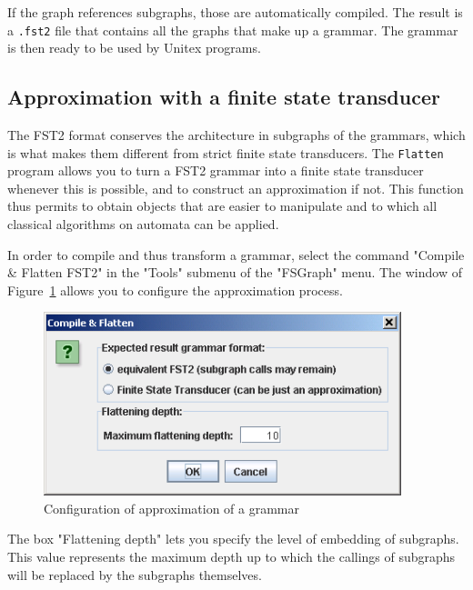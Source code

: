 \noindent If the graph references subgraphs, those are automatically compiled.
The result is a \verb+.fst2+ file that contains all the graphs
that make up a grammar. The grammar is then ready to be used by Unitex programs.

\subsection{Approximation with a finite state transducer}
\label{flatten-section}
The FST2 format conserves the architecture in subgraphs of the grammars, which
is what makes them different from strict finite state transducers. The 
\verb+Flatten+ program allows you to turn a FST2 grammar into a finite
state transducer whenever this is possible, and to construct an approximation if not.
This function thus permits to obtain objects that are easier to manipulate and
to which all classical algorithms on automata can be applied.

\bigskip
\noindent In order to compile and thus transform a grammar, select the command
"Compile \& Flatten FST2" in the "Tools" submenu of the "FSGraph" menu. The
window of Figure~\ref{fig-flatten-configuration} allows you to
configure the approximation process.

\bigskip
\begin{figure}[!h]
\begin{center}
\includegraphics[width=10.4cm]{resources/img/fig6-5.png}
\caption{Configuration of approximation of a
grammar\label{fig-flatten-configuration}}
\end{center}
\end{figure}

\noindent The box "Flattening depth" lets you specify the level of embedding of
subgraphs. This value represents the maximum depth up to which the callings of
subgraphs will be replaced by the subgraphs themselves.

